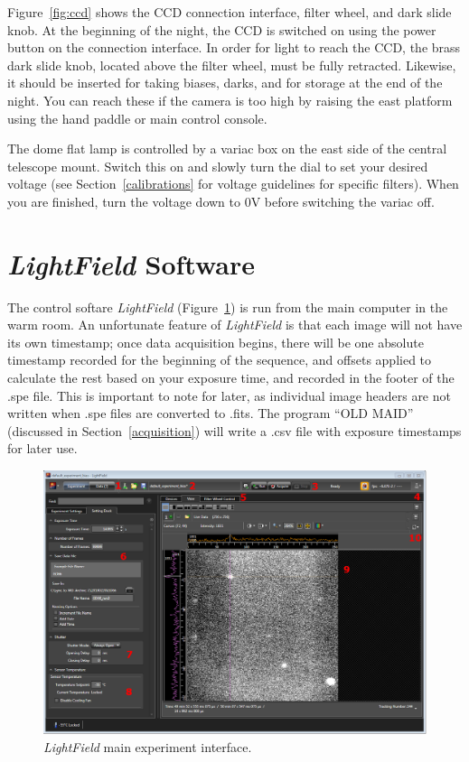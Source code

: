 \documentclass[12pt]{article}
\begin{document}
Figure~\ref{fig:ccd} shows the CCD connection interface, filter wheel, and dark slide knob. At the beginning of the night, the CCD is switched on using the power button on the connection interface. In order for light to reach the CCD, the brass dark slide knob, located above the filter wheel, must be fully retracted. Likewise, it should be inserted for taking biases, darks, and for storage at the end of the night. You can reach these if the camera is too high by raising the east platform using the hand paddle or main control console.\par
\indent The dome flat lamp is controlled by a variac box on the east side of the central telescope mount. Switch this on and slowly turn the dial to set your desired voltage (see Section~\ref{calibrations} for voltage guidelines for specific filters). When you are finished, turn the voltage down to 0V before switching the variac off.\par

\section{\textit{LightField} Software}\label{lightfield}

The control softare \textit{LightField} (Figure~\ref{fig:lf}) is run from the main computer in the warm room. An unfortunate feature of \textit{LightField} is that each image will not have its own timestamp; once data acquisition begins, there will be one absolute timestamp recorded for the beginning of the sequence, and offsets applied to calculate the rest based on your exposure time, and recorded in the footer of the .spe file. This is important to note for later, as individual image headers are not written when .spe files are converted to .fits. The program ``OLD MAID'' (discussed in Section~\ref{acquisition}) will write a .csv file with exposure timestamps for later use.\par

\begin{figure}[t]
   \centering
   \includegraphics[width=\textwidth]{LightField_exp.PNG}
   \caption{\textit{LightField} main experiment interface.\label{fig:lf}}
\end{figure}
\end{document}

